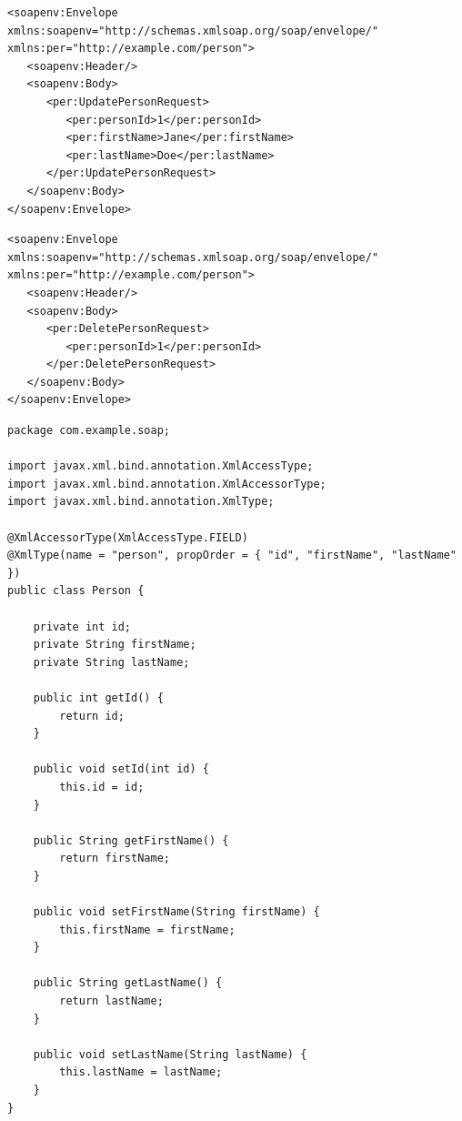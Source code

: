 \noindent\begin{minipage}{\textwidth}
\begin{lstlisting}[caption={SOAP read },captionpos=b,label={lst:s_read}]
<soapenv:Envelope xmlns:soapenv="http://schemas.xmlsoap.org/soap/envelope/" xmlns:per="http://example.com/person">
   <soapenv:Header/>
   <soapenv:Body>
      <per:UpdatePersonRequest>
         <per:personId>1</per:personId>
         <per:firstName>Jane</per:firstName>
         <per:lastName>Doe</per:lastName>
      </per:UpdatePersonRequest>
   </soapenv:Body>
</soapenv:Envelope>
\end{lstlisting}
\end{minipage}
\noindent\begin{minipage}{\textwidth}
\begin{lstlisting}[caption={SOAP delete},captionpos=b,label={lst:s_delete}]
<soapenv:Envelope xmlns:soapenv="http://schemas.xmlsoap.org/soap/envelope/" xmlns:per="http://example.com/person">
   <soapenv:Header/>
   <soapenv:Body>
      <per:DeletePersonRequest>
         <per:personId>1</per:personId>
      </per:DeletePersonRequest>
   </soapenv:Body>
</soapenv:Envelope>
\end{lstlisting}
\end{minipage}
\noindent\begin{minipage}{\textwidth}
\begin{lstlisting}[caption={SOAP Class Person},captionpos=b,label={lst:soap_person}]
package com.example.soap;

import javax.xml.bind.annotation.XmlAccessType;
import javax.xml.bind.annotation.XmlAccessorType;
import javax.xml.bind.annotation.XmlType;

@XmlAccessorType(XmlAccessType.FIELD)
@XmlType(name = "person", propOrder = { "id", "firstName", "lastName" })
public class Person {

    private int id;
    private String firstName;
    private String lastName;

    public int getId() {
        return id;
    }

    public void setId(int id) {
        this.id = id;
    }

    public String getFirstName() {
        return firstName;
    }

    public void setFirstName(String firstName) {
        this.firstName = firstName;
    }

    public String getLastName() {
        return lastName;
    }

    public void setLastName(String lastName) {
        this.lastName = lastName;
    }
}
\end{lstlisting}
\end{minipage}


